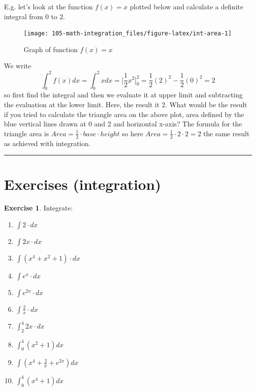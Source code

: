 \documentclass[
]{book}
\providecommand{\tightlist}{%
  \setlength{\itemsep}{0pt}\setlength{\parskip}{0pt}}
\theoremstyle{definition}
\theoremstyle{definition}
\theoremstyle{definition}
\newtheorem{exercise}{Exercise}[chapter]
\theoremstyle{remark}
\begin{document}
E.g. let's look at the function \(f(x) = x\) plotted below and calculate a definite integral from \(0\) to \(2\).

\begin{figure}

{\centering \texttt{[image: 105-math-integration\_files/figure-latex/int-area-1]} 

}

\caption{Graph of function $f(x) = x$}\label{fig:int-area}
\end{figure}

We write \[\int_{0}^2f(x)dx = \int_{0}^2 xdx =  \Bigr[ \frac{1}{2}x^2\Bigr]_0^2 = \frac{1}{2}(2)^2 - \frac{1}{2}(0)^2 = 2\] so first find the integral and then we evaluate it at upper limit and subtracting the evaluation at the lower limit. Here, the result it 2. What would be the result if you tried to calculate the triangle area on the above plot, area defined by the blue vertical lines drawn at 0 and 2 and horizontal x-axis? The formula for the triangle area is \(Area = \frac{1}{2}\cdot base \cdot height\) so here \(Area = \frac{1}{2} \cdot 2 \cdot 2 = 2\) the same result as achieved with integration.

\begin{center}\rule{0.5\linewidth}{0.5pt}\end{center}

\hypertarget{exercises-integration}{%
\section{Exercises (integration)}\label{exercises-integration}}

\begin{exercise}
\protect\hypertarget{exr:m-int}{}{\label{exr:m-int} }
Integrate:

\begin{enumerate}
\def\labelenumi{\alph{enumi})}
\tightlist
\item
  \(\int 2 \cdot dx\)
\item
  \(\int 2x\cdot dx\)
\item
  \(\int (x^4 + x^2 + 1)\cdot dx\)
\item
  \(\int e^x\cdot dx\)
\item
  \(\int e^{2x}\cdot dx\)
\item
  \(\int \frac{2}{x}\cdot dx\)
\item
  \(\int_2^4 2x\cdot dx\)
\item
  \(\int_0^4 (x^2+1)dx\)
\item
  \(\int (x^4 + \frac{2}{x} + e^{2x}) dx\)
\item
  \(\int_0^4 (x^4+1) dx\)
\end{enumerate}
\end{exercise}
\end{document}
